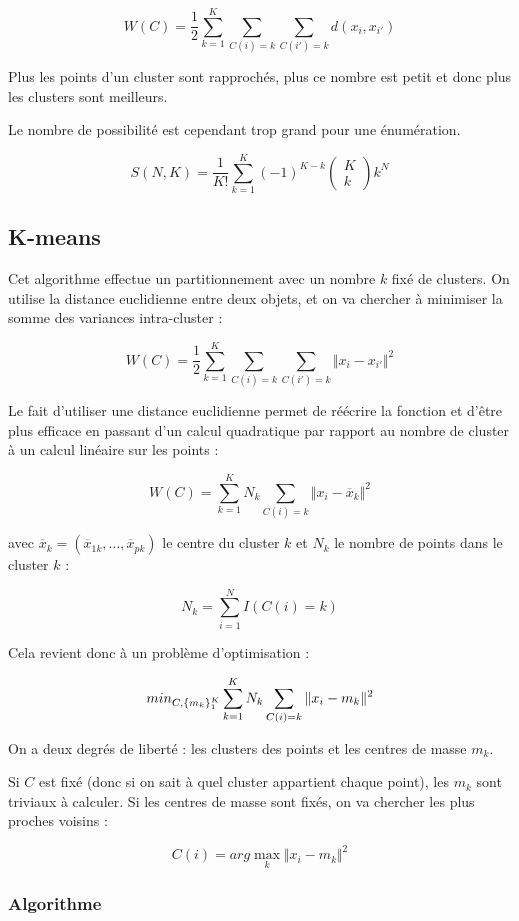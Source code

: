 		$$W(C) = \frac{1}{2} \sum_{k = 1}^K \sum_{C(i) = k} \sum_{C(i') = k} d(x_i, x_{i'})$$
		
		Plus les points d'un cluster sont rapprochés, plus ce nombre est petit et donc plus les clusters sont meilleurs.
		
		Le nombre de possibilité est cependant trop grand pour une énumération.
		
		$$S(N, K) = \frac{1}{K!} \sum_{k = 1}^K(-1)^{K - k} \begin{pmatrix}
		K \\ 
		k
		\end{pmatrix}  k^N$$
	
	\subsection{K-means}
	
	Cet algorithme effectue un partitionnement avec un nombre $k$ fixé de clusters. On utilise la distance euclidienne entre deux objets, et on va chercher à minimiser la somme des variances intra-cluster :
	
	$$W(C) = \frac{1}{2} \sum_{k = 1}^K \sum_{C(i) = k} \sum_{C(i') = k} \Vert x_i - x_{i'} \Vert^2$$ 
	
	Le fait d'utiliser une distance euclidienne permet de réécrire la fonction et d'être plus efficace en passant d'un calcul quadratique par rapport au nombre de cluster à un calcul linéaire sur les points :
	
	$$W(C) = \sum_{k = 1}^K N_k \sum_{C(i) = k} \Vert x_i - \overline{x}_k \Vert^2$$
	
	avec $\overline{x}_k = (\overline{x}_{1k}, \dots, \overline{x}_{pk})$ le centre du cluster $k$ et $N_k$ le nombre de points dans le cluster $k$ :
	
	$$N_k = \sum_{i = 1}^N I(C(i) = k)$$
	
	Cela revient donc à un problème d'optimisation :
	
	$$min_{C, \lbrace m_k \rbrace^K_1} \sum_{k = 1}^K N_k \sum_{C(i) = k} \Vert x_i - m_k \Vert^2$$
	
	On a deux degrés de liberté : les clusters des points et les centres de masse $m_k$.
	
	Si $C$ est fixé (donc si on sait à quel cluster appartient chaque point), les $m_k$ sont triviaux à calculer. Si les centres de masse sont fixés, on va chercher les plus proches voisins :
	
	$$C(i) = arg \max_k \Vert x_i - m_k \Vert^2$$
	
	
		\subsubsection{Algorithme}
		
